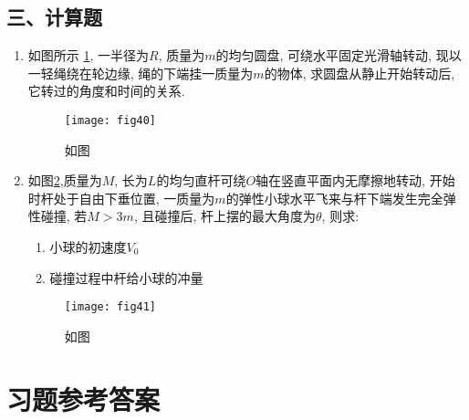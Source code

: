 \subsection*{三、计算题}
\begin{enumerate}
    \item 如图所示 \ref{fig:40}, 一半径为$R$, 质量为$m$的均匀圆盘, 可绕水平固定光滑轴转动, 
    现以一轻绳绕在轮边缘, 绳的下端挂一质量为$m$的物体, 
    求圆盘从静止开始转动后, 它转过的角度和时间的关系.
    \begin{figure}[H]
        \centering
        \texttt{[image: fig40]}
            \caption{如图}\label{fig:40}
    \end{figure}
    \item 如图\ref{fig:41},质量为$M$, 长为$L$的均匀直杆可绕$O$轴在竖直平面内无摩擦地转动, 开始时杆处于自由下垂位置, 
    一质量为$m$的弹性小球水平飞来与杆下端发生完全弹性碰撞, 若$M>3m$, 且碰撞后, 杆上摆的最大角度为$\theta$, 则求:
    \begin{enumerate}
        \item[(1)] 小球的初速度$V_0$
        \item[(2)] 碰撞过程中杆给小球的冲量
    \end{enumerate}
        \begin{figure}[H]
            \centering
            \texttt{[image: fig41]}
                \caption{如图}\label{fig:41}
        \end{figure}
        
\end{enumerate}

\section{习题参考答案}
